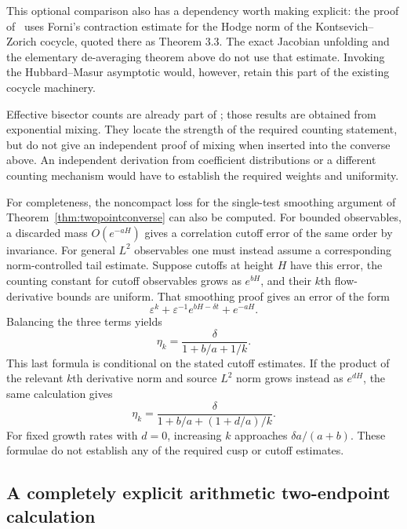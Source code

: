 This optional comparison also has a dependency worth making
explicit: the proof of~\cite[Proposition 2.5 and Section 3.2]{ABEMPolar}
uses Forni's contraction estimate for the Hodge norm of the
Kontsevich--Zorich cocycle, quoted there as Theorem 3.3. The exact
Jacobian unfolding and the elementary de-averaging theorem above
do not use that estimate. Invoking the Hubbard--Masur asymptotic
would, however, retain this part of the existing cocycle machinery.

Effective bisector counts are already part of
\cite[Section 10]{AranaHerreraLattice}; those results are obtained
from exponential mixing. They locate the strength of the required
counting statement, but do not give an independent proof of mixing
when inserted into the converse above. An independent derivation
from coefficient distributions or a different counting mechanism
would have to establish the required weights and uniformity.

For completeness, the noncompact loss for the single-test smoothing
argument of Theorem~\ref{thm:twopointconverse} can also be computed. For bounded
observables, a discarded mass $O(e^{-aH})$ gives a correlation cutoff
error of the same order by invariance. For general $L^2$ observables
one must instead assume a corresponding norm-controlled tail estimate.
Suppose cutoffs at height $H$ have this error, the counting
constant for cutoff observables grows as $e^{bH}$, and their $k$th
flow-derivative bounds are uniform. That smoothing proof gives an
error of the form
\[
 \varepsilon^k+
      \varepsilon^{-1}e^{bH-\delta t}+e^{-aH}.
\]
Balancing the three terms yields
\begin{equation}
 \eta_k=\frac{\delta}{1+b/a+1/k}.
 \label{eq:twopointcusprate}
\end{equation}
This last formula is conditional on the stated cutoff estimates.
If the product of the relevant $k$th derivative norm and source
$L^2$ norm grows instead as $e^{dH}$, the same calculation gives
\[
 \eta_k=\frac{\delta}{1+b/a+(1+d/a)/k}.
\]
For fixed growth rates with $d=0$, increasing $k$ approaches
$\delta a/(a+b)$. These formulae do not establish any of the
required cusp or cutoff estimates.


\subsection{A completely explicit arithmetic two-endpoint calculation}


